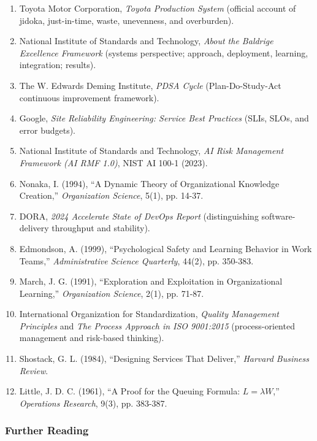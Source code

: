 \begin{enumerate}
    \item[\textbf{[O1]}] Toyota Motor Corporation, \textit{Toyota Production System} (official account of jidoka, just-in-time, waste, unevenness, and overburden).
    \item[\textbf{[O2]}] National Institute of Standards and Technology, \textit{About the Baldrige Excellence Framework} (systems perspective; approach, deployment, learning, integration; results).
    \item[\textbf{[O3]}] The W. Edwards Deming Institute, \textit{PDSA Cycle} (Plan-Do-Study-Act continuous improvement framework).
    \item[\textbf{[O4]}] Google, \textit{Site Reliability Engineering: Service Best Practices} (SLIs, SLOs, and error budgets).
    \item[\textbf{[O5]}] National Institute of Standards and Technology, \textit{AI Risk Management Framework (AI RMF 1.0)}, NIST AI 100-1 (2023).
    \item[\textbf{[O6]}] Nonaka, I. (1994), ``A Dynamic Theory of Organizational Knowledge Creation,'' \textit{Organization Science}, 5(1), pp. 14-37.
    \item[\textbf{[O7]}] DORA, \textit{2024 Accelerate State of DevOps Report} (distinguishing software-delivery throughput and stability).
    \item[\textbf{[O8]}] Edmondson, A. (1999), ``Psychological Safety and Learning Behavior in Work Teams,'' \textit{Administrative Science Quarterly}, 44(2), pp. 350-383.
    \item[\textbf{[O9]}] March, J. G. (1991), ``Exploration and Exploitation in Organizational Learning,'' \textit{Organization Science}, 2(1), pp. 71-87.
    \item[\textbf{[O10]}] International Organization for Standardization, \textit{Quality Management Principles} and \textit{The Process Approach in ISO 9001:2015} (process-oriented management and risk-based thinking).
    \item[\textbf{[O11]}] Shostack, G. L. (1984), ``Designing Services That Deliver,'' \textit{Harvard Business Review}.
    \item[\textbf{[O12]}] Little, J. D. C. (1961), ``A Proof for the Queuing Formula: $L = \lambda W$,'' \textit{Operations Research}, 9(3), pp. 383-387.
\end{enumerate}

\subsubsection*{Further Reading}


